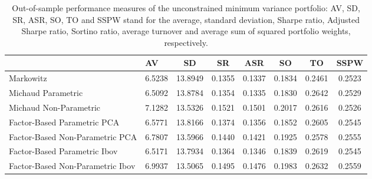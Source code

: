 \begin{table}

\caption{\label{tab:unc_mvp}Out-of-sample performance measures of the unconstrained minimum variance portfolio: AV, SD, SR, ASR, SO, TO and SSPW stand for the average, standard deviation, Sharpe ratio, Adjusted Sharpe ratio, Sortino ratio, average turnover and average sum of squared portfolio weights, respectively.}
\centering
\begin{tabular}[t]{l|l|c|c|c|c|c|c}
\hline
  & AV & SD & SR & ASR & SO & TO & SSPW\\
\hline
Markowitz & 6.5238 & 13.8949 & 0.1355 & 0.1337 & 0.1834 & 0.2461 & 0.2523\\
\hline
Michaud Parametric & 6.5092 & 13.8784 & 0.1354 & 0.1335 & 0.1830 & 0.2642 & 0.2529\\
\hline
Michaud Non-Parametric & 7.1282 & 13.5326 & 0.1521 & 0.1501 & 0.2017 & 0.2616 & 0.2526\\
\hline
Factor-Based Parametric PCA & 6.5771 & 13.8166 & 0.1374 & 0.1356 & 0.1852 & 0.2605 & 0.2545\\
\hline
Factor-Based Non-Parametric PCA & 6.7807 & 13.5966 & 0.1440 & 0.1421 & 0.1925 & 0.2578 & 0.2555\\
\hline
Factor-Based Parametric Ibov & 6.5171 & 13.7934 & 0.1364 & 0.1346 & 0.1839 & 0.2619 & 0.2545\\
\hline
Factor-Based Non-Parametric Ibov & 6.9937 & 13.5065 & 0.1495 & 0.1476 & 0.1983 & 0.2632 & 0.2559\\
\hline
\end{tabular}
\end{table}
